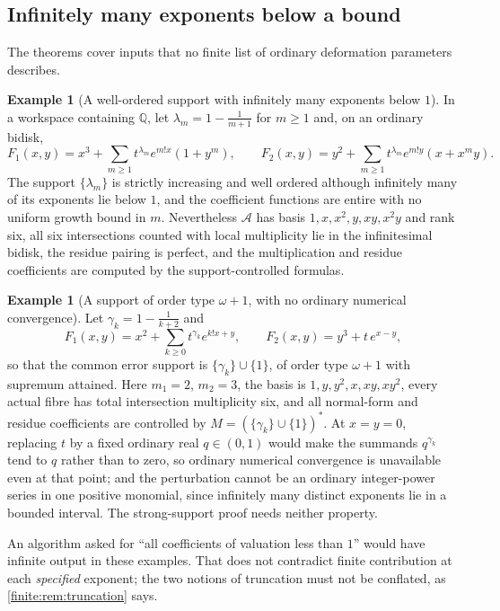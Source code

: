 \documentclass[11pt,letterpaper]{article}
\theoremstyle{definition}
\newtheorem{example}[theorem]{Example}
\theoremstyle{remark}
\newcommand{\Q}{\mathbb Q}
\newcommand{\Alg}{\mathcal A}
\numberwithin{equation}{section}
\begin{document}
\subsection{Infinitely many exponents below a bound}
\label{finite:sec:infsupport}

The theorems cover inputs that no finite list of ordinary deformation parameters describes.

\begin{example}[A well-ordered support with infinitely many exponents below $1$]
\label{finite:ex:infsupport}
In a workspace containing $\Q$, let $\lambda_m=1-\tfrac1{m+1}$ for $m\geq1$ and, on an ordinary bidisk,
\[
 F_1(x,y)=x^3+\sum_{m\geq1}t^{\lambda_m}e^{m!x}(1+y^m),
 \qquad
 F_2(x,y)=y^2+\sum_{m\geq1}t^{\lambda_m}e^{m!y}(x+x^my).
\]
The support $\{\lambda_m\}$ is strictly increasing and well ordered although infinitely many of its exponents lie below $1$, and the coefficient functions are entire with no uniform growth bound in $m$. Nevertheless $\Alg$ has basis $1,x,x^2,y,xy,x^2y$ and rank six, all six intersections counted with local multiplicity lie in the infinitesimal bidisk, the residue pairing is perfect, and the multiplication and residue coefficients are computed by the support-controlled formulas.
\end{example}

\begin{example}[A support of order type $\omega+1$, with no ordinary numerical convergence]
\label{finite:ex:nondiscrete}
Let $\gamma_k=1-\tfrac1{k+2}$ and
\[
 F_1(x,y)=x^2+\sum_{k\geq0}t^{\gamma_k}e^{k!x+y},
 \qquad
 F_2(x,y)=y^3+t\,e^{x-y},
\]
so that the common error support is $\{\gamma_k\}\cup\{1\}$, of order type $\omega+1$ with supremum attained. Here $m_1=2$, $m_2=3$, the basis is $1,y,y^2,x,xy,xy^2$, every actual fibre has total intersection multiplicity six, and all normal-form and residue coefficients are controlled by $M=(\{\gamma_k\}\cup\{1\})^*$. At $x=y=0$, replacing $t$ by a fixed ordinary real $q\in(0,1)$ would make the summands $q^{\gamma_k}$ tend to $q$ rather than to zero, so ordinary numerical convergence is unavailable even at that point; and the perturbation cannot be an ordinary integer-power series in one positive monomial, since infinitely many distinct exponents lie in a bounded interval. The strong-support proof needs neither property.
\end{example}

An algorithm asked for ``all coefficients of valuation less than $1$'' would have infinite output in these examples. That does not contradict finite contribution at each \emph{specified} exponent; the two notions of truncation must not be conflated, as \cref{finite:rem:truncation} says.
\end{document}
